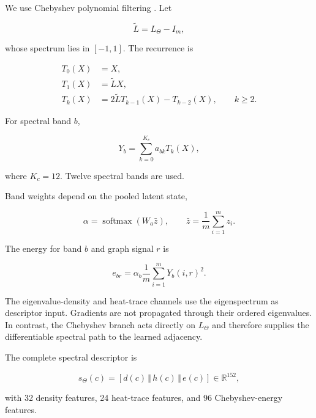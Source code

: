 \documentclass[authoryear,final,5p,times,twocolumn]{elsarticle}
\theoremstyle{plain}
\begin{document}
We use Chebyshev polynomial filtering \cite{??}. Let

\begin{equation}
\widetilde{L}
=
L_{\Theta}-I_m,
\end{equation}

whose spectrum lies in $[-1,1]$. The recurrence is

\begin{align}
\label{eq:cheb_recursion}
T_0(X) &= X, \nonumber\\
T_1(X) &= \widetilde{L}X,\\
T_k(X)
&=
2\widetilde{L}T_{k-1}(X)-T_{k-2}(X),
\qquad k\geq2.
\nonumber
\end{align}

For spectral band $b$,

\begin{equation}
\label{eq:cheb_filter}
Y_b
=
\sum_{k=0}^{K_c}
a_{bk}T_k(X),
\end{equation}

where $K_c=12$. Twelve spectral bands are used.

Band weights depend on the pooled latent state,

\begin{equation}
\label{eq:spectral_attention}
\alpha
=
\operatorname{softmax}
\left(
    W_a\bar{z}
\right),
\qquad
\bar{z}
=
\frac{1}{m}
\sum_{i=1}^{m}z_i.
\end{equation}

The energy for band $b$ and graph signal $r$ is

\begin{equation}
\label{eq:spectral_energy}
e_{br}
=
\alpha_b
\frac{1}{m}
\sum_{i=1}^{m}
Y_b(i,r)^2.
\end{equation}

The eigenvalue-density and heat-trace channels use the eigenspectrum as
descriptor input. Gradients are not propagated through their ordered
eigenvalues. In contrast, the Chebyshev branch acts directly on
$L_{\Theta}$ and therefore supplies the differentiable spectral path to the
learned adjacency.

The complete spectral descriptor is

\begin{equation}
\label{eq:complete_spectral_descriptor}
s_{\Theta}(c)
=
\left[
    d(c)
    \,\Vert\,
    h(c)
    \,\Vert\,
    e(c)
\right]
\in
\mathbb{R}^{152},
\end{equation}

with 32 density features, 24 heat-trace features, and 96 Chebyshev-energy
features.
\end{document}
